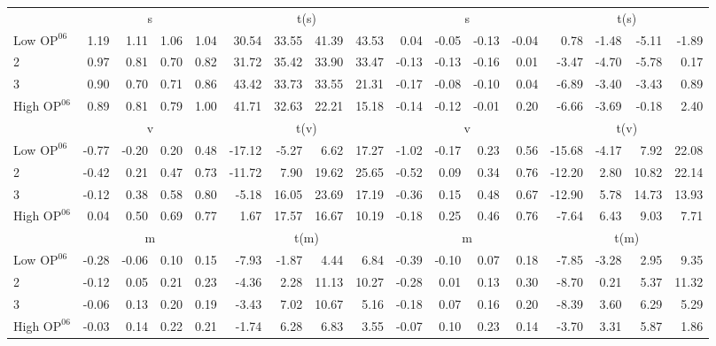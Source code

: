\begin{table}[!ht]
\begin{tabular}{lrrrrrrrrrrrrrrrr}
  
     & \multicolumn{4}{c}{s} & \multicolumn{4}{c}{t(s)}  & \multicolumn{4}{c}{s} & \multicolumn{4}{c}{t(s)}   \\
     \cmidrule(r){2-5} \cmidrule(r){6-9}  \cmidrule(r){10-13} \cmidrule(r){14-17} 
    Low $\text{OP}^{06}$  & 1.19  & 1.11  & 1.06  & 1.04  & 30.54  & 33.55  & 41.39  & 43.53  & 0.04  & -0.05  & -0.13  & -0.04  & 0.78  & -1.48  & -5.11  & -1.89   \\
    2  & 0.97  & 0.81  & 0.70  & 0.82  & 31.72  & 35.42  & 33.90  & 33.47  & -0.13  & -0.13  & -0.16  & 0.01  & -3.47  & -4.70  & -5.78  & 0.17   \\
    3  & 0.90  & 0.70  & 0.71  & 0.86  & 43.42  & 33.73  & 33.55  & 21.31  & -0.17  & -0.08  & -0.10  & 0.04  & -6.89  & -3.40  & -3.43  & 0.89   \\
    High $\text{OP}^{06}$  & 0.89  & 0.81  & 0.79  & 1.00  & 41.71  & 32.63  & 22.21  & 15.18  & -0.14  & -0.12  & -0.01  & 0.20  & -6.66  & -3.69  & -0.18  & 2.40   \\
    
  
     & \multicolumn{4}{c}{v} & \multicolumn{4}{c}{t(v)}  & \multicolumn{4}{c}{v} & \multicolumn{4}{c}{t(v)}   \\
     \cmidrule(r){2-5} \cmidrule(r){6-9}  \cmidrule(r){10-13} \cmidrule(r){14-17} 
    Low $\text{OP}^{06}$  & -0.77  & -0.20  & 0.20  & 0.48  & -17.12  & -5.27  & 6.62  & 17.27  & -1.02  & -0.17  & 0.23  & 0.56  & -15.68  & -4.17  & 7.92  & 22.08   \\
    2  & -0.42  & 0.21  & 0.47  & 0.73  & -11.72  & 7.90  & 19.62  & 25.65  & -0.52  & 0.09  & 0.34  & 0.76  & -12.20  & 2.80  & 10.82  & 22.14   \\
    3  & -0.12  & 0.38  & 0.58  & 0.80  & -5.18  & 16.05  & 23.69  & 17.19  & -0.36  & 0.15  & 0.48  & 0.67  & -12.90  & 5.78  & 14.73  & 13.93   \\
    High $\text{OP}^{06}$  & 0.04  & 0.50  & 0.69  & 0.77  & 1.67  & 17.57  & 16.67  & 10.19  & -0.18  & 0.25  & 0.46  & 0.76  & -7.64  & 6.43  & 9.03  & 7.71   \\
    
  
     & \multicolumn{4}{c}{m} & \multicolumn{4}{c}{t(m)}  & \multicolumn{4}{c}{m} & \multicolumn{4}{c}{t(m)}   \\
     \cmidrule(r){2-5} \cmidrule(r){6-9}  \cmidrule(r){10-13} \cmidrule(r){14-17} 
    Low $\text{OP}^{06}$  & -0.28  & -0.06  & 0.10  & 0.15  & -7.93  & -1.87  & 4.44  & 6.84  & -0.39  & -0.10  & 0.07  & 0.18  & -7.85  & -3.28  & 2.95  & 9.35   \\
    2  & -0.12  & 0.05  & 0.21  & 0.23  & -4.36  & 2.28  & 11.13  & 10.27  & -0.28  & 0.01  & 0.13  & 0.30  & -8.70  & 0.21  & 5.37  & 11.32   \\
    3  & -0.06  & 0.13  & 0.20  & 0.19  & -3.43  & 7.02  & 10.67  & 5.16  & -0.18  & 0.07  & 0.16  & 0.20  & -8.39  & 3.60  & 6.29  & 5.29   \\
    High $\text{OP}^{06}$  & -0.03  & 0.14  & 0.22  & 0.21  & -1.74  & 6.28  & 6.83  & 3.55  & -0.07  & 0.10  & 0.23  & 0.14  & -3.70  & 3.31  & 5.87  & 1.86   \\
    

\end{tabular}
\end{table}
